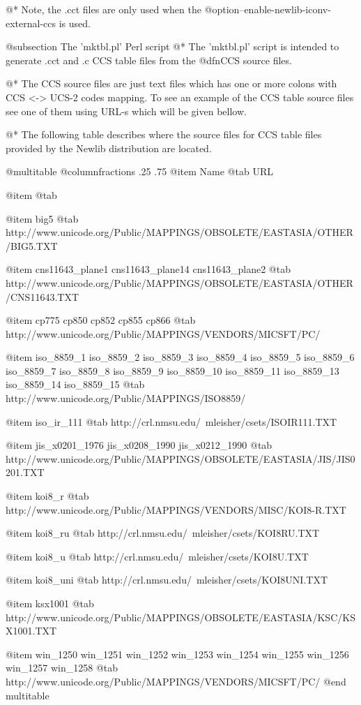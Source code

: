 @*
Note, the .cct files are only used when the
@option{--enable-newlib-iconv-external-ccs} is used.

@subsection The 'mktbl.pl' Perl script
@*
The 'mktbl.pl' script is intended to generate .cct and .c CCS table
files from the @dfn{CCS source files}.

@*
The CCS source files are just text files which has one or more colons
with CCS <-> UCS-2 codes mapping. To see an example of the CCS table
source files see one of them using URL-s which will be given bellow.

@*
The following table describes where the source files for CCS table files
provided by the Newlib distribution are located.

@multitable @columnfractions .25 .75
@item
Name
@tab
URL

@item
@tab

@item
big5
@tab
http://www.unicode.org/Public/MAPPINGS/OBSOLETE/EASTASIA/OTHER/BIG5.TXT

@item
cns11643_plane1
cns11643_plane14
cns11643_plane2
@tab
http://www.unicode.org/Public/MAPPINGS/OBSOLETE/EASTASIA/OTHER/CNS11643.TXT

@item
cp775
cp850
cp852
cp855
cp866
@tab
http://www.unicode.org/Public/MAPPINGS/VENDORS/MICSFT/PC/

@item
iso_8859_1
iso_8859_2
iso_8859_3
iso_8859_4
iso_8859_5
iso_8859_6
iso_8859_7
iso_8859_8
iso_8859_9
iso_8859_10
iso_8859_11
iso_8859_13
iso_8859_14
iso_8859_15
@tab
http://www.unicode.org/Public/MAPPINGS/ISO8859/

@item
iso_ir_111
@tab
http://crl.nmsu.edu/~mleisher/csets/ISOIR111.TXT

@item
jis_x0201_1976
jis_x0208_1990
jis_x0212_1990
@tab
http://www.unicode.org/Public/MAPPINGS/OBSOLETE/EASTASIA/JIS/JIS0201.TXT

@item
koi8_r
@tab
http://www.unicode.org/Public/MAPPINGS/VENDORS/MISC/KOI8-R.TXT

@item
koi8_ru
@tab
http://crl.nmsu.edu/~mleisher/csets/KOI8RU.TXT

@item
koi8_u
@tab
http://crl.nmsu.edu/~mleisher/csets/KOI8U.TXT

@item
koi8_uni
@tab
http://crl.nmsu.edu/~mleisher/csets/KOI8UNI.TXT

@item
ksx1001
@tab
http://www.unicode.org/Public/MAPPINGS/OBSOLETE/EASTASIA/KSC/KSX1001.TXT

@item
win_1250
win_1251
win_1252
win_1253
win_1254
win_1255
win_1256
win_1257
win_1258
@tab
http://www.unicode.org/Public/MAPPINGS/VENDORS/MICSFT/PC/
@end multitable

